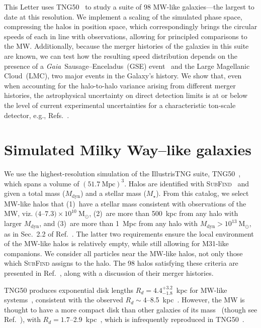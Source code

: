 \documentclass[aps,prl,reprint,superscriptaddress,nopreprintnumbers,nobibnotes,floatfix,longbibliography,footinbib]{revtex4-2}
\newcommand{\Illustris}{Illustris}
\newcommand{\TNG}{TNG}
\newcommand{\TNGfifty}{TNG50}
\newcommand{\Subfind}{\textsc{SubFind}}
\newcommand{\Msun}{\ensuremath{\mathrm{M}_\odot}}
\newcommand{\Mdyn}{\ensuremath{M_\mathrm{dyn}}}
\newcommand{\Mstar}{\ensuremath{M_\star}}
\begin{document}
This Letter uses \TNGfifty{}~\citep{Nelson19a,Pillepich19} to study a suite of 98 MW-like galaxies---the largest to date at this resolution. We implement a scaling of the simulated phase space, compressing the halos in position space, which correspondingly brings the circular speeds of each in line with observations, allowing for principled comparisons to the MW. Additionally, because the merger histories of the galaxies in this suite are known, we can test how the resulting speed distribution depends on the presence of a \emph{Gaia}~Sausage--Enceladus~(GSE) event~\cite{Helmi18,Belokurov18,Deason24} and the Large Magellanic Cloud~(LMC), two major events in the Galaxy's history. We show that, even when accounting for the halo-to-halo variance arising from different merger histories, the astrophysical uncertainty on direct detection limits is at or below the level of current experimental uncertainties for a characteristic ton-scale detector, e.g., Refs.~\cite{XENONCollaboration18,XENONCollaboration23,LZCollaboration25}.

\section{Simulated Milky Way--like galaxies}
\label{sec:2}
We use the highest-resolution simulation of the \Illustris\TNG{} suite, \TNGfifty{}~\citep{Nelson19a,Pillepich19}, which spans a volume of $(51.7~\text{Mpc})^3$. Halos are identified with \Subfind{}~\citep{Springel01,Dolag09} and given a total mass (\Mdyn{}) and a stellar mass (\Mstar{}). From this catalog, we select MW-like halos that (1)~have a stellar mass consistent with observations of the MW, viz. $(4$--$7.3)\times 10^{10}~\Msun$, (2)~are more than 500~kpc from any halo with larger \Mdyn{}, and (3)~are more than 1~Mpc from any halo with $\Mdyn > 10^{13}~\Msun$, as in Sec.~2.2 of Ref.~\citep{Folsom25}. The latter two requirements ensure the local environment of the MW-like halos is relatively empty, while still allowing for M31-like companions. We consider all particles near the MW-like halos, not only those which \Subfind{} assigns to the halo. The 98 halos satisfying these criteria are presented in Ref.~\citep{Folsom25}, along with a discussion of their merger histories.
 
\TNGfifty{} produces exponential disk lengths $R_d = 4.4_{-1.8}^{+3.2}$~kpc for MW-like systems~\citep{Sotillo-Ramos22,Pillepich24}, consistent with the observed $R_d\sim4$--8.5~kpc~\citep{Gadotti09,Pillepich24}. However, the MW is thought to have a more compact disk than other galaxies of its mass~\citep{Hammer07,Bovy13,Licquia16a,Boardman20,Tsukui25} (though see Ref.~\citep{Lian24}), with $R_d=1.7$--2.9~kpc~\citep{Hammer07,Juric08,Rix13,Bland-Hawthorn16,Pillepich24}, which is infrequently reproduced in \TNGfifty{}~\citep{Varma22,Rosas-Guevara22,Sotillo-Ramos22,Pillepich24}. 
\end{document}
